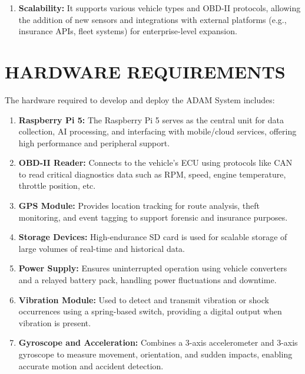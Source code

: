 \begin{enumerate}
    \item \textbf{Scalability:}
    It supports various vehicle types and OBD-II protocols, allowing the addition of new sensors and integrations with external platforms (e.g., insurance APIs, fleet systems) for enterprise-level expansion.
\end{enumerate}

\section{HARDWARE REQUIREMENTS}
The hardware required to develop and deploy the ADAM System includes:
\begin{enumerate}
    \item \textbf{Raspberry Pi 5:} The Raspberry Pi 5 serves as the central unit for data collection, AI processing, and interfacing with mobile/cloud services, offering high performance and peripheral support.
    \item \textbf{OBD-II Reader:} Connects to the vehicle’s ECU using protocols like CAN to read critical diagnostics data such as RPM, speed, engine temperature, throttle position, etc.
    \item \textbf{GPS Module:} Provides location tracking for route analysis, theft monitoring, and event tagging to support forensic and insurance purposes.
    \item \textbf{Storage Devices:} High-endurance SD card is used for scalable storage of large volumes of real-time and historical data.
    \item \textbf{Power Supply:} Ensures uninterrupted operation using vehicle converters and a relayed battery pack, handling power fluctuations and downtime.
    \item \textbf{Vibration Module:} Used to detect and transmit vibration or shock occurrences using a spring-based switch, providing a digital output when vibration is present. 
    \item \textbf{Gyroscope and Acceleration:} Combines a 3-axis accelerometer and 3-axis gyroscope to measure movement, orientation, and sudden impacts, enabling accurate motion and accident detection.
\end{enumerate}


